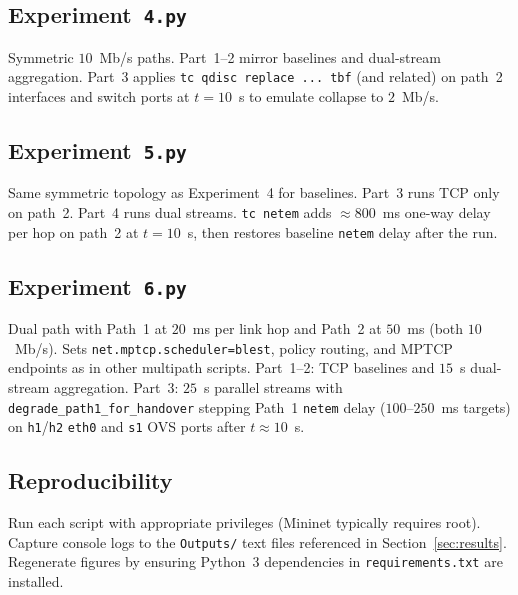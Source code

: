 \subsection{Experiment~\texttt{4.py}}
Symmetric $10$~Mb/s paths. Part~1--2 mirror baselines and dual-stream aggregation. Part~3 applies \texttt{tc qdisc replace ... tbf} (and related) on path~2 interfaces and switch ports at $t=10$~s to emulate collapse to $2$~Mb/s.

\subsection{Experiment~\texttt{5.py}}
Same symmetric topology as Experiment~4 for baselines. Part~3 runs TCP only on path~2. Part~4 runs dual streams. \texttt{tc netem} adds $\approx 800$~ms one-way delay per hop on path~2 at $t=10$~s, then restores baseline \texttt{netem} delay after the run.

\subsection{Experiment~\texttt{6.py}}
Dual path with Path~1 at $20$~ms per link hop and Path~2 at $50$~ms (both $10$~Mb/s). Sets \texttt{net.mptcp.scheduler=blest}, policy routing, and MPTCP endpoints as in other multipath scripts. Part~1--2: TCP baselines and $15$~s dual-stream aggregation. Part~3: $25$~s parallel streams with \texttt{degrade\_path1\_for\_handover} stepping Path~1 \texttt{netem} delay ($100$--$250$~ms targets) on \texttt{h1}/\texttt{h2} \texttt{eth0} and \texttt{s1} OVS ports after $t\approx 10$~s.

\subsection{Reproducibility}
Run each script with appropriate privileges (Mininet typically requires root). Capture console logs to the \texttt{Outputs/} text files referenced in Section~\ref{sec:results}. Regenerate figures by ensuring Python~3 dependencies in \texttt{requirements.txt} are installed.
